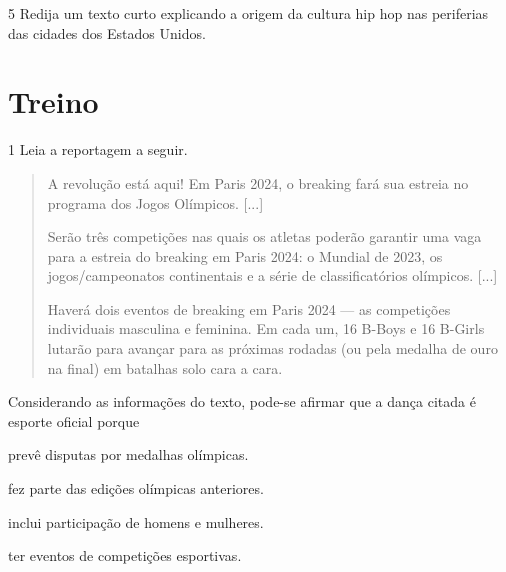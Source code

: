 \num{5} Redija um texto curto explicando a origem da cultura hip hop
nas periferias das cidades dos Estados Unidos.



\section*{Treino}

\num{1} Leia a reportagem a seguir.

\begin{quote}
A revolução está aqui! Em Paris 2024, o breaking fará sua
estreia no programa dos Jogos Olímpicos. {[}...{]}

Serão três competições nas quais os atletas poderão garantir uma vaga
para a estreia do breaking em Paris 2024: o Mundial de 2023, os
jogos/campeonatos continentais e a série de classificatórios olímpicos.
{[}...{]}

Haverá dois eventos de breaking em Paris 2024 --- as competições
individuais masculina e feminina. Em cada um, 16 B-Boys e 16 B-Girls
lutarão para avançar para as próximas rodadas (ou pela medalha de ouro
na final) em batalhas solo cara a cara.

\end{quote}

Considerando as informações do texto, pode-se afirmar que a dança citada
é esporte oficial porque

\begin{escolha}
\item prevê disputas por medalhas olímpicas.

\item fez parte das edições olímpicas anteriores.

\item inclui participação de homens e mulheres.

\item ter eventos de competições esportivas.
\end{escolha}



